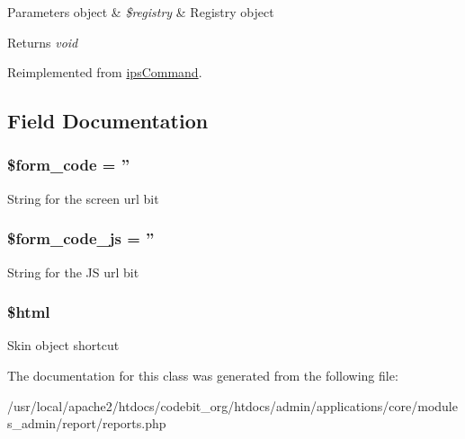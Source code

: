 \begin{DoxyParams}[1]{Parameters}
object & {\em \$registry} & Registry object \\
\hline
\end{DoxyParams}
\begin{DoxyReturn}{Returns}
{\itshape void} 
\end{DoxyReturn}


Reimplemented from \hyperlink{classips_command_afbc4e912a0604b94d47d66744c64d8ba}{ips\-Command}.



\subsection{Field Documentation}
\hypertarget{classadmin__core__report__reports_af28aee726fa3eb6c355d08a2ab655e03}{
\subsubsection[{\$form\-\_\-code}]{\setlength{\rightskip}{0pt plus 5cm}\$form\-\_\-code = ''}}\label{classadmin__core__report__reports_af28aee726fa3eb6c355d08a2ab655e03}
String for the screen url bit \hypertarget{classadmin__core__report__reports_ac68fe8a02a2efd63c3271179f4b4fbb7}{
\subsubsection[{\$form\-\_\-code\-\_\-js}]{\setlength{\rightskip}{0pt plus 5cm}\$form\-\_\-code\-\_\-js = ''}}\label{classadmin__core__report__reports_ac68fe8a02a2efd63c3271179f4b4fbb7}
String for the J\-S url bit \hypertarget{classadmin__core__report__reports_a6f96e7fc92441776c9d1cd3386663b40}{
\subsubsection[{\$html}]{\setlength{\rightskip}{0pt plus 5cm}\$html}}\label{classadmin__core__report__reports_a6f96e7fc92441776c9d1cd3386663b40}
Skin object shortcut 

The documentation for this class was generated from the following file\-:\begin{DoxyCompactItemize}
\item 
/usr/local/apache2/htdocs/codebit\-\_\-org/htdocs/admin/applications/core/modules\-\_\-admin/report/reports.\-php\end{DoxyCompactItemize}
